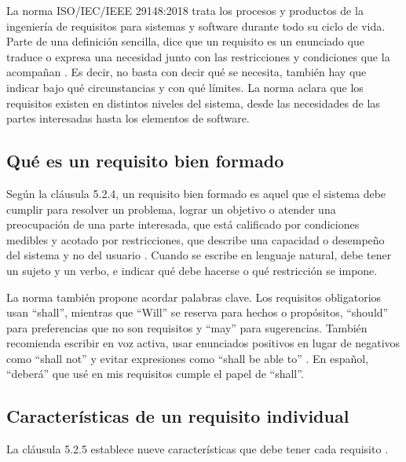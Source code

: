\documentclass[conference,onecolumn]{IEEEtran}
\begin{document}
La norma ISO/IEC/IEEE 29148:2018 trata los procesos y productos de la ingeniería de requisitos para sistemas y software durante todo su ciclo de vida. Parte de una definición sencilla, dice que un requisito es un enunciado que traduce o expresa una necesidad junto con las restricciones y condiciones que la acompañan \cite[\nopp cl.~3.1.19]{ieee29148}. Es decir, no basta con decir qué se necesita, también hay que indicar bajo qué circunstancias y con qué límites. La norma aclara que los requisitos existen en distintos niveles del sistema, desde las necesidades de las partes interesadas hasta los elementos de software.

\subsection{Qué es un requisito bien formado}

Según la cláusula 5.2.4, un requisito bien formado es aquel que el sistema debe cumplir para resolver un problema, lograr un objetivo o atender una preocupación de una parte interesada, que está calificado por condiciones medibles y acotado por restricciones, que describe una capacidad o desempeño del sistema y no del usuario \cite[\nopp cl.~5.2.4]{ieee29148}. Cuando se escribe en lenguaje natural, debe tener un sujeto y un verbo, e indicar qué debe hacerse o qué restricción se impone.

La norma también propone acordar palabras clave. Los requisitos obligatorios usan “shall”, mientras que “Will” se reserva para hechos o propósitos, “should” para preferencias que no son requisitos y “may” para sugerencias. También recomienda escribir en voz activa, usar enunciados positivos en lugar de negativos como “shall not” y evitar expresiones como “shall be able to” \cite[\nopp cl.~5.2.4]{ieee29148}. En español, “deberá” que usé en mis requisitos cumple el papel de “shall”.

\subsection{Características de un requisito individual}

La cláusula 5.2.5 establece nueve características que debe tener cada requisito \cite[\nopp cl.~5.2.5]{ieee29148}.
\end{document}
